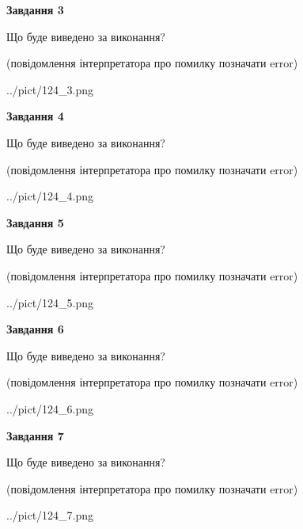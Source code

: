\documentclass[12pt, ukrainian]{article}
\begin{document}
{\begin {large}
{\begin {center}\textbf{Завдання 3}\end {center}}\par
Що буде виведено за виконання?\par
 (повідомлення інтерпретатора про помилку позначати error)\par
\begin{center}
	{../pict/124_3.png}
\end{center}
\newpage

{\begin {center}\textbf{Завдання 4}\end {center}}\par
Що буде виведено за виконання?\par
 (повідомлення інтерпретатора про помилку позначати error)\par
\begin{center}
	{../pict/124_4.png}
\end{center}
\newpage

{\begin {center}\textbf{Завдання 5}\end {center}}\par
Що буде виведено за виконання?\par
 (повідомлення інтерпретатора про помилку позначати error)\par
\begin{center}
	{../pict/124_5.png}
\end{center}
\newpage

{\begin {center}\textbf{Завдання 6}\end {center}}\par
Що буде виведено за виконання?\par
 (повідомлення інтерпретатора про помилку позначати error)\par
\begin{center}
	{../pict/124_6.png}
\end{center}
\newpage

{\begin {center}\textbf{Завдання 7}\end {center}}\par
Що буде виведено за виконання?\par
 (повідомлення інтерпретатора про помилку позначати error)\par
\begin{center}
	{../pict/124_7.png}
\end{center}
\newpage


\end{large}}
\end{document}
